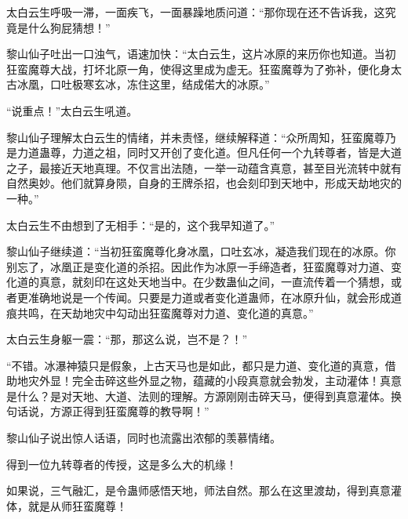 \begin{this_body}
太白云生呼吸一滞，一面疾飞，一面暴躁地质问道：“那你现在还不告诉我，这究竟是什么狗屁猜想！”

黎山仙子吐出一口浊气，语速加快：“太白云生，这片冰原的来历你也知道。当初狂蛮魔尊大战，打坏北原一角，使得这里成为虚无。狂蛮魔尊为了弥补，便化身太古冰凰，口吐极寒玄冰，冻住这里，结成偌大的冰原。”

“说重点！”太白云生吼道。

黎山仙子理解太白云生的情绪，并未责怪，继续解释道：“众所周知，狂蛮魔尊乃是力道蛊尊，力道之祖，同时又开创了变化道。但凡任何一个九转尊者，皆是大道之子，最接近天地真理。不仅言出法随，一举一动蕴含真意，甚至目光流转中就有自然奥妙。他们就算身陨，自身的王牌杀招，也会刻印到天地中，形成天劫地灾的一种。”

太白云生不由想到了无相手：“是的，这个我早知道了。”

黎山仙子继续道：“当初狂蛮魔尊化身冰凰，口吐玄冰，凝造我们现在的冰原。你别忘了，冰凰正是变化道的杀招。因此作为冰原一手缔造者，狂蛮魔尊对力道、变化道的真意，就刻印在这处天地当中。在少数蛊仙之间，一直流传着一个猜想，或者更准确地说是一个传闻。只要是力道或者变化道蛊师，在冰原升仙，就会形成道痕共鸣，在天劫地灾中勾动出狂蛮魔尊对力道、变化道的真意。”

太白云生身躯一震：“那，那这么说，岂不是？！”

“不错。冰瀑神猿只是假象，上古天马也是如此，都只是力道、变化道的真意，借助地灾外显！完全击碎这些外显之物，蕴藏的小段真意就会勃发，主动灌体！真意是什么？是对天地、大道、法则的理解。方源刚刚击碎天马，便得到真意灌体。换句话说，方源正得到狂蛮魔尊的教导啊！”

黎山仙子说出惊人话语，同时也流露出浓郁的羡慕情绪。

得到一位九转尊者的传授，这是多么大的机缘！

如果说，三气融汇，是令蛊师感悟天地，师法自然。那么在这里渡劫，得到真意灌体，就是从师狂蛮魔尊！

\end{this_body}

